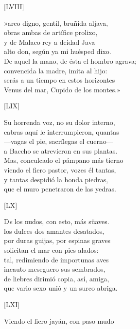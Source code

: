 \documentclass[11pt,a4paper,twoside]{article}
\begin{document}
\begin{center}
	[LVIII]
\end{center}\pstart
»arco digno, gentil, bruñida aljava,\\
obras ambas de artífice prolixo,\\
y de Malaco rey a deidad Java\\
alto don, según ya mi huésped dixo.\\
De aquel la mano, de ésta el hombro agrava;\\
convencida la madre, imita al hijo:\\
serás a un tiempo en estos horizontes\\
Venus del mar, Cupido de los montes.»\pend
\begin{center}
	[LIX]
\end{center}\pstart
Su horrenda voz, no su dolor interno,\\
cabras aquí le interrumpieron, quantas\\
—vagas el pie, sacrílegas el cuerno—\\
a Baccho se atrevieron en sus plantas.\\
Mas, conculcado el pámpano más tierno\\
viendo el fiero pastor, vozes él tantas,\\
y tantas despidió la honda piedras,\\
que el muro penetraron de las yedras.\pend
\begin{center}
	[LX]
\end{center}\pstart
D\textit{e} los nudos, con esto, más süaves.\\
los dulces dos amantes desatados,\\
por duras guijas, por espinas graves\\
solicitan el mar con pies alados:\\
tal, redimiendo de importunas aves\\
incauto meseguero sus sembrados,\\
de liebres dirimió copia, así, amiga,\\
que vario sexo unió y un surco abriga.\pend
\begin{center}
	[LXI]
\end{center}\pstart
Viendo el fiero jayán, con paso mudo\\
\end{document}
